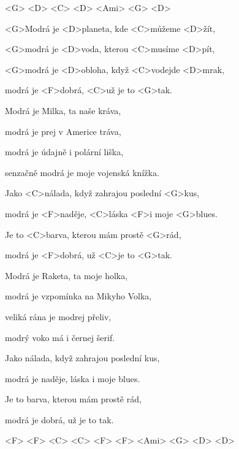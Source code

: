 

<G> <D> <C> <D> <Ami> <G> <D>

\zs
<G>Modrá je <D>planeta, kde <C>můžeme <D>žít,

<G>modrá je <D>voda, kterou <C>musíme <D>pít,

<G>modrá je <D>obloha, když <C>vodejde <D>mrak,

modrá je <F>dobrá, <C>už je to <G>tak.
\ks

\zs
Modrá je Milka, ta naše kráva,

modrá je prej v Americe tráva,

modrá je údajně i polární liška,

senzačně modrá je moje vojenská knížka.
\ks

\zr
Jako <C>nálada, když zahrajou poslední <G>kus,

modrá je <F>naděje, <C>láska <F>i moje <G>blues.

Je to <C>barva, kterou mám prostě <G>rád,

modrá je <F>dobrá, už <C>je to <G>tak.
\kr

\zs
Modrá je Raketa, ta moje holka,

modrá je vzpomínka na Mikyho Volka,

veliká rána je modrej přeliv,

modrý voko má i černej šerif.
\ks

\zs
Jako nálada, když zahrajou poslední kus,

modrá je naděje, láska i moje blues.

Je to barva, kterou mám prostě rád,

modrá je dobrá, už je to tak.
\ks

<F> <F> <C> <C> <F> <F> <Ami> <G> <D> <D>

\kp
